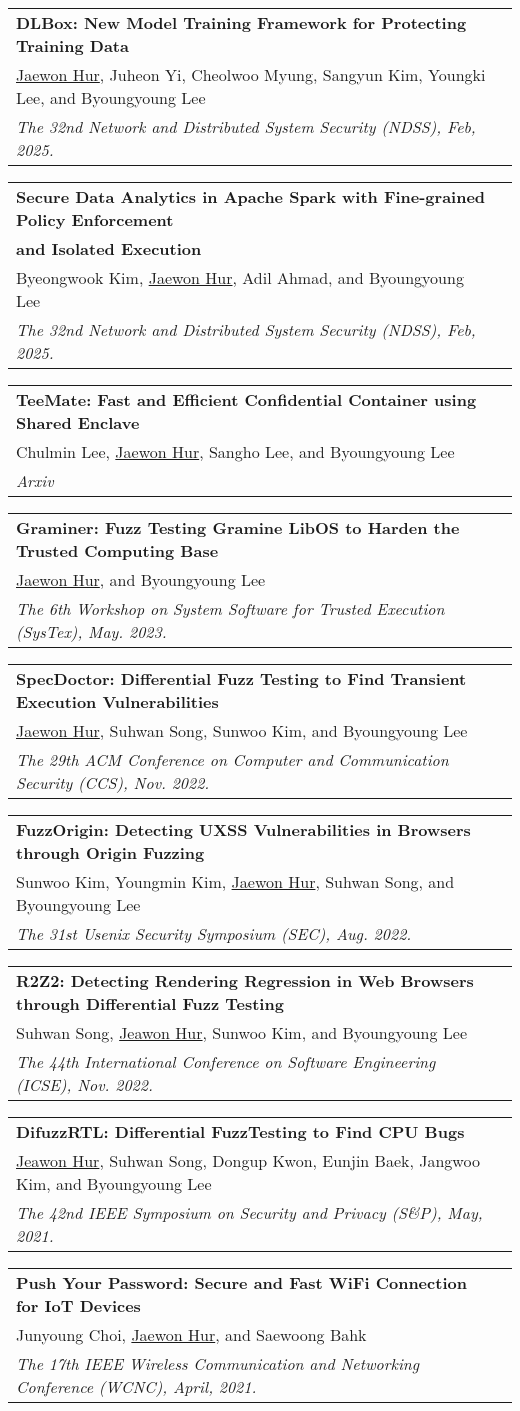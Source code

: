 \documentclass[letterpaper,11pt]{article}
\makeatletter
\newcommand{\pubSubheading}[3]{
  \vspace{0pt}\item
    \begin{tabular*}{0.97\textwidth}[t]{l@{\extracolsep{\fill}}r}
      \vspace{1pt}
      \textbf{#1} \\ \vspace{1pt}
      #2 \\
      \textit{\small#3}
    \end{tabular*}\vspace{-7pt}
}
\newcommand{\pubSubheadingNewline}[4]{
  \vspace{0pt}\item
    \begin{tabular*}{0.97\textwidth}[t]{l@{\extracolsep{\fill}}r}
      \vspace{1pt}
      \textbf{#1} \\ \vspace{1pt}
      \textbf{#2} \\ \vspace{1pt}
      #3 \\
      \textit{\small#4}
    \end{tabular*}\vspace{-7pt}
}
\makeatother
\begin{document}
    \pubSubheading
      {DLBox: New Model Training Framework for Protecting Training Data}
      {\underline{Jaewon Hur}, Juheon Yi, Cheolwoo Myung, Sangyun Kim, Youngki Lee, and Byoungyoung Lee}
      {The 32nd Network and Distributed System Security (NDSS), Feb, 2025.}

    \pubSubheadingNewline
      {Secure Data Analytics in Apache Spark with Fine-grained Policy Enforcement}
      {and Isolated Execution}
      {Byeongwook Kim, \underline{Jaewon Hur}, Adil Ahmad, and Byoungyoung Lee}
      {The 32nd Network and Distributed System Security (NDSS), Feb, 2025.}

    \pubSubheading
      {TeeMate: Fast and Efficient Confidential Container using Shared Enclave}
      {Chulmin Lee, \underline{Jaewon Hur}, Sangho Lee, and Byoungyoung Lee}
      {Arxiv}

    \pubSubheading
      {Graminer: Fuzz Testing Gramine LibOS to Harden the Trusted Computing Base}
      {\underline{Jaewon Hur}, and Byoungyoung Lee}
      {The 6th Workshop on System Software for Trusted Execution (SysTex), May. 2023.}

    \pubSubheading
      {SpecDoctor: Differential Fuzz Testing to Find Transient Execution Vulnerabilities}
      {\underline{Jaewon Hur}, Suhwan Song, Sunwoo Kim, and Byoungyoung Lee}
      {The 29th ACM Conference on Computer and Communication Security (CCS), Nov. 2022.}

    \pubSubheading
      {FuzzOrigin: Detecting UXSS Vulnerabilities in Browsers through Origin Fuzzing}
      {Sunwoo Kim, Youngmin Kim, \underline{Jaewon Hur}, Suhwan Song, and Byoungyoung Lee}
      {The 31st Usenix Security Symposium (SEC), Aug. 2022.}

    \pubSubheading
      {R2Z2: Detecting Rendering Regression in Web Browsers through Differential Fuzz Testing}
      {Suhwan Song, \underline{Jeawon Hur}, Sunwoo Kim, and Byoungyoung Lee}
      {The 44th International Conference on Software Engineering (ICSE), Nov. 2022.}

    \pubSubheading
      {DifuzzRTL: Differential FuzzTesting to Find CPU Bugs}
      {\underline{Jeawon Hur}, Suhwan Song, Dongup Kwon, Eunjin Baek, Jangwoo Kim, and Byoungyoung Lee}
      {The 42nd IEEE Symposium on Security and Privacy (S\&P), May, 2021.}

    \pubSubheading
      {Push Your Password: Secure and Fast WiFi Connection for IoT Devices}
      {Junyoung Choi, \underline{Jaewon Hur}, and Saewoong Bahk}
      {The 17th IEEE Wireless Communication and Networking Conference (WCNC), April, 2021.}
\end{document}
